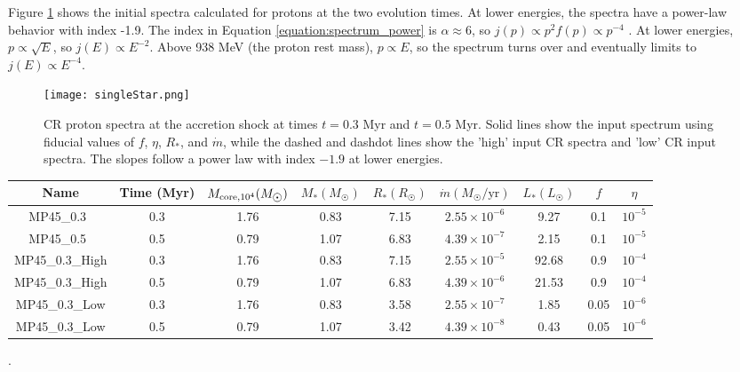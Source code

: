 \documentclass[twocolumn]{aastex63}
\def\t{\text}
\begin{document}
Figure \ref{fig:initial_spectrum} shows the initial spectra calculated for protons at the two evolution times. At lower energies, the spectra have a power-law behavior with index -1.9. The index in Equation \ref{equation:spectrum_power} is $\alpha\approx6$, so $j(p) \propto p^2 f(p) \propto p^{-4}$ \citep{amato_2015_CRs}. At lower energies, $p \propto \sqrt{E}$, so $j(E) \propto E^{-2}$. Above 938 MeV (the proton rest mass), $p \propto E$, so the spectrum turns over and eventually limits to $j(E) \propto E^{-4}$. 

\begin{figure}[th!]
\centering
\texttt{[image: singleStar.png]}
\caption{CR proton spectra at the accretion shock at times $t=0.3$ Myr and $t=0.5$ Myr. Solid lines show the input spectrum using fiducial values of $f$, $\eta$, $R_*$, and $\dot{m}$, while the dashed and dashdot lines show the 'high' input CR spectra and 'low' CR input spectra. The slopes follow a power law with index $-1.9$ at lower energies.}
\label{fig:initial_spectrum}
\end{figure}

\begin{table*} 
\centering
\begin{tabular}{ |c c c c c c c c c| } 
\hline
 Name & Time (Myr) & $M_{\rm core, 10^{4}} (M_{\astrosun})$  & $M_{*} (M_{\astrosun})$ & $R_{*} (R_{\astrosun})$ & $\dot{m} (M_{\astrosun}/\t{yr})$ & $L_{*} (L_{\astrosun})$ & $f$ & $\eta$ \\
 \hline
MP45\_0.3\ & 0.3 & 1.76 & 0.83 & 7.15 & $2.55\times 10^{-6}$ & 9.27 & 0.1 & $10^{-5}$ \\
MP45\_0.5\ & 0.5 & 0.79 & 1.07 & 6.83 & $4.39\times 10^{-7}$ & 2.15 & 0.1 & $10^{-5}$ \\
MP45\_0.3\_High & 0.3 & 1.76 & 0.83 & 7.15 & $2.55\times 10^{-5}$ & 92.68 & 0.9 & $10^{-4}$ \\
MP45\_0.3\_High & 0.5 & 0.79 & 1.07 & 6.83 & $4.39\times 10^{-6}$ & 21.53 & 0.9 & $10^{-4}$ \\
MP45\_0.3\_Low & 0.3 & 1.76 & 0.83 & 3.58 & $2.55\times 10^{-7}$ & 1.85 & 0.05 & $10^{-6}$ \\
MP45\_0.3\_Low & 0.5 & 0.79 & 1.07 & 3.42 & $4.39\times 10^{-8}$ & 0.43 & 0.05 & $10^{-6}$ \\
 \hline
\end{tabular}
\caption{Properties of the protostar that we use to construct the initial CR spectra. First three columns are the simulation name, time, and core mass. Remaining columns are protostellar mass, radius, accretion rate, and accretion luminosity, and the stellar filling fraction and shock efficiency. All runs assume a stellar magnetic field of $B_*=10$ G. The input CR spectrum for each setup is shown in Figure \ref{fig:initial_spectrum}}.
\label{table:star_parameters}
\end{table*}
\end{document}
